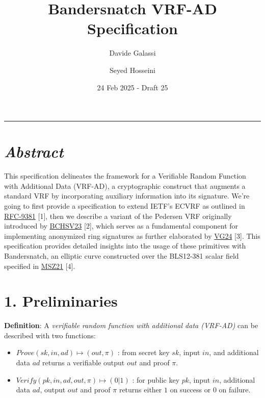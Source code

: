 \documentclass[
]{article}
\title{Bandersnatch VRF-AD Specification}
\author{Davide Galassi \and Seyed Hosseini}
\date{24 Feb 2025 - Draft 25}
\begin{document}
\maketitle

\newcommand{\G}{\langle G \rangle}
\newcommand{\F}{\mathbb{Z}^*_r}

\begin{center}\rule{0.5\linewidth}{0.5pt}\end{center}

\section{\texorpdfstring{\emph{Abstract}}{Abstract}}\label{abstract}

This specification delineates the framework for a Verifiable Random
Function with Additional Data (VRF-AD), a cryptographic construct that
augments a standard VRF by incorporating auxiliary information into its
signature. We're going to first provide a specification to extend IETF's
ECVRF as outlined in
\href{https://datatracker.ietf.org/doc/rfc9381}{RFC-9381} {[}1{]}, then
we describe a variant of the Pedersen VRF originally introduced by
\href{https://eprint.iacr.org/2023/002}{BCHSV23} {[}2{]}, which serves
as a fundamental component for implementing anonymized ring signatures
as further elaborated by
\href{https://github.com/davxy/ring-proof-spec}{VG24} {[}3{]}. This
specification provides detailed insights into the usage of these
primitives with Bandersnatch, an elliptic curve constructed over the
BLS12-381 scalar field specified in
\href{https://eprint.iacr.org/2021/1152}{MSZ21} {[}4{]}.

\section{1. Preliminaries}\label{preliminaries}

\textbf{Definition}: A \emph{verifiable random function with additional
data (VRF-AD)} can be described with two functions:

\begin{itemize}
\item
  \(Prove(sk,in,ad) \mapsto (out,\pi)\) : from secret key \(sk\), input
  \(in\), and additional data \(ad\) returns a verifiable output \(out\)
  and proof \(\pi\).
\item
  \(Verify(pk,in,ad,out,\pi) \mapsto (0|1)\) : for public key \(pk\),
  input \(in\), additional data \(ad\), output \(out\) and proof \(\pi\)
  returns either \(1\) on success or \(0\) on failure.
\end{itemize}
\end{document}
